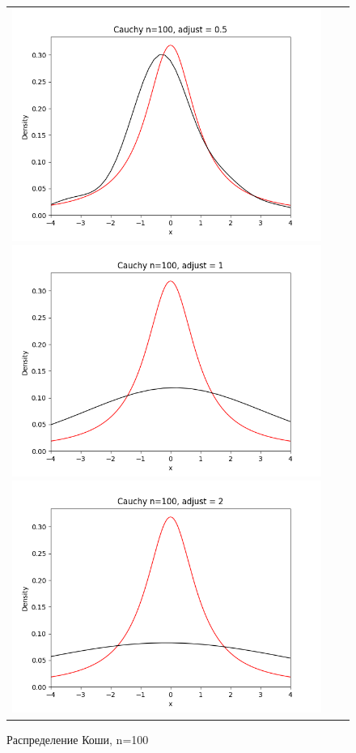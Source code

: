 \begin{figure}[H]
	\begin{tabular}{ccc}
		\includegraphics[scale=0.33]{cauchy_n100_adjust0.5.png}
		\includegraphics[scale=0.33]{cauchy_n100_adjust1.png}
		\includegraphics[scale=0.33]{cauchy_n100_adjust2.png}
	\end{tabular}
	\caption{Распределение Коши, n=100}
\end{figure}

